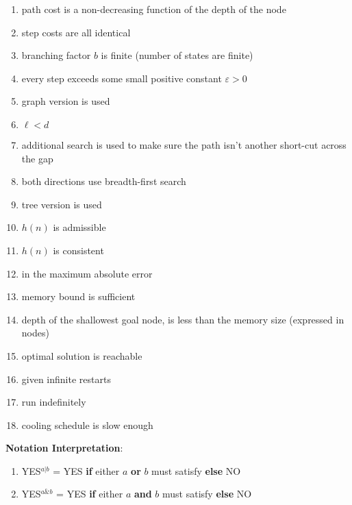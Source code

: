 \begin{multicols}{2}
\begin{enumerate}

\item path cost is a non-decreasing function of the depth of the node
\item step costs are all identical
\item branching factor $b$ is finite (number of states are finite)
\item every step exceeds some small positive constant $\varepsilon > 0$
\item graph version is used
\item $\ell < d$
\item additional search is used to make sure the path isn’t another short-cut across the gap
\item both directions use breadth-first search
\item tree version is used
\item $h(n)$ is admissible
\item $h(n)$ is consistent
\item in the maximum absolute error
\item memory bound is sufficient
\item depth of the shallowest goal node, is less than the memory size (expressed in nodes)
\item optimal solution is reachable
\item given infinite restarts
\item run indefinitely
\item cooling schedule is slow enough


\end{enumerate}
\end{multicols}

\vspace{0.5cm}
\textbf{Notation Interpretation}:
\vspace{0.2cm}
\begin{multicols}{2}
\begin{enumerate}

\item YES$^{a|b}$ = YES \textbf{if} either $a$ \textbf{or} $b$ must satisfy \textbf{else} NO

\item YES$^{a\&b}$ = YES \textbf{if} either $a$ \textbf{and} $b$ must satisfy \textbf{else} NO

\end{enumerate}
\end{multicols}















